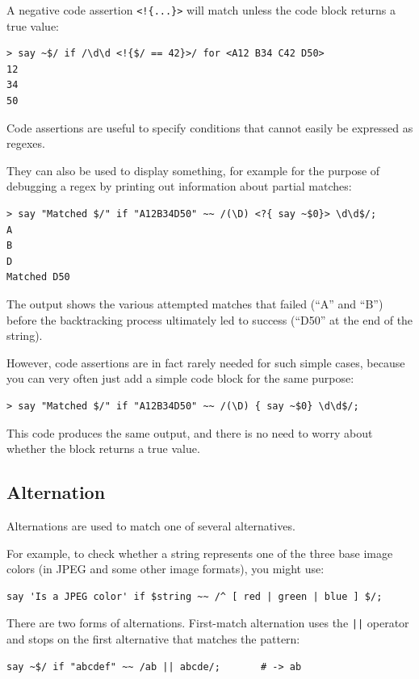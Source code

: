 A negative code assertion \verb'<!{...}>' will 
match unless the code block returns a true value:
\begin{verbatim}
> say ~$/ if /\d\d <!{$/ == 42}>/ for <A12 B34 C42 D50>
12
34
50
\end{verbatim}

Code assertions are useful to specify conditions that 
cannot easily be expressed as regexes. 

They can also be used to display something, for example 
for the purpose of debugging a regex by printing out 
information about partial matches:

\begin{verbatim}
> say "Matched $/" if "A12B34D50" ~~ /(\D) <?{ say ~$0}> \d\d$/;
A
B
D
Matched D50
\end{verbatim}

The output shows the various attempted matches that 
failed (``A'' and ``B'') before the backtracking 
process ultimately led to success (``D50'' at the end 
of the string).

However, code assertions are in fact rarely needed for 
such simple cases, because you can very often just add 
a simple code block for the same purpose:
%
\begin{verbatim}
> say "Matched $/" if "A12B34D50" ~~ /(\D) { say ~$0} \d\d$/;
\end{verbatim}
This code produces the same output, and there is no need 
to worry about whether the block returns a true value.


\subsection{Alternation}

Alternations are used to match one of several alternatives.

For example, to check whether a string represents one of the 
three base image colors (in JPEG and some other image formats), 
you might use:

\begin{verbatim}
say 'Is a JPEG color' if $string ~~ /^ [ red | green | blue ] $/;
\end{verbatim}
%

There are two forms of alternations. First-match alternation 
uses the \verb'||' operator and stops on the first alternative 
that matches the pattern:

\begin{verbatim}
say ~$/ if "abcdef" ~~ /ab || abcde/;       # -> ab
\end{verbatim}
%

